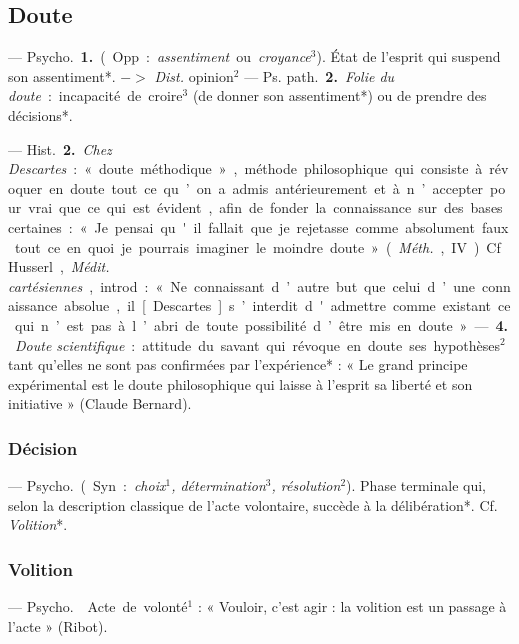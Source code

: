 \subsection{Doute}
 — \si{Psycho.} {\bf 1.} (Opp. :
{\it assentiment} ou {\it croyance}$^3$). État de l'esprit
qui suspend son assentiment*.
$->$ {\it Dist.} opinion$^2$ — \si{Ps. path.}
 {\bf 2.} {\it Folie du doute} : incapacité de
croire$^3$ (de donner son assentiment*)
ou de prendre des décisions*.

— \si{Hist.} {\bf 2.} {\it Chez Descartes} : « doute
méthodique », méthode philosophique qui consiste à révoquer en
doute tout ce qu’on a admis antérieurement et à n’accepter pour vrai
que ce qui est évident, afin de fonder
la connaissance sur des bases certaines : « Je pensai qu'il fallait que
je rejetasse comme absolument faux
tout ce en quoi je pourrais imaginer
le moindre doute » ({\it Méth.}, IV). Cf.
Husserl, {\it Médit. cartésiennes}, introd. :
« Ne connaissant d’autre but que
celui d’une connaissance absolue,
il [Descartes] s’interdit d'admettre
comme existant ce qui n’est pas à
l’abri de toute possibilité d’être mis
en doute ». — {\bf 4.} {\it Doute scientifique} :
attitude du savant qui révoque en
doute ses hypothèses$^2$ tant qu’elles
ne sont pas confirmées par l’expérience* : « Le grand principe expérimental est le doute philosophique
qui laisse à l’esprit sa liberté et son
initiative » (Claude Bernard).

\subsubsection{Décision}
 — \si{Psycho.} (Syn. : {\it choix$^1$,
détermination$^3$, résolution}$^2$). Phase
terminale qui, selon la description
classique de l’acte volontaire, succède à la délibération*. Cf. {\it Volition}*.

\subsubsection{Volition}
 — \si{Psycho.}  Acte de volonté$^1$ : « Vouloir,
c’est agir : la volition est un passage à l'acte » (Ribot).

